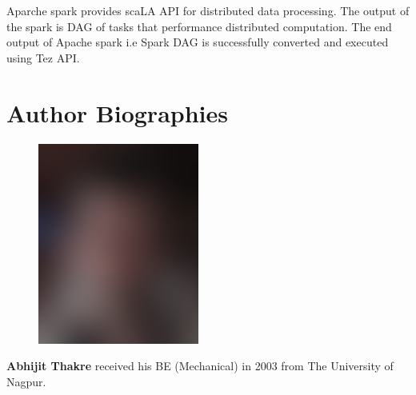 \documentclass[9pt,twocolumn,twoside]{../../styles/osajnl}
\begin{document}
  Aparche spark provides scaLA API for distributed data processing. The output of the spark is DAG of tasks that performance distributed computation. The end output of Apache spark i.e Spark DAG is successfully converted and executed using Tez API.

 \newpage



 
\section*{Author Biographies}
\begingroup
\setlength\intextsep{0pt}
\begin{minipage}[t][3.2cm][t]{1.0\columnwidth} %
  \begin{figure}
    \includegraphics[width=0.25\columnwidth]{images/john_smith.eps}
  \end{figure}
  \noindent
  {\bfseries Abhijit Thakre} received his BE (Mechanical) in 2003 from
  The University of Nagpur.
\end{minipage}
\endgroup


\appendix
\end{document}
